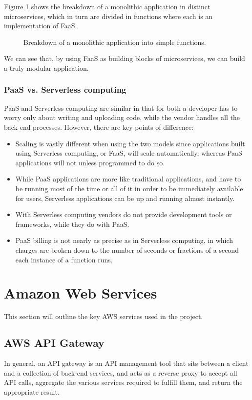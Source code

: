 Figure \ref{fig:monolithic_breakdown} shows the breakdown of a monolithic application in distinct microservices, which in turn are divided in functions where each is an implementation of FaaS. 
\begin{figure}[!htb]
    \centering
    
    \caption{Breakdown of a monolithic application into simple functions. \cite{faas}}
    \label{fig:monolithic_breakdown}
\end{figure}

We can see that, by using FaaS as building blocks of microservices, we can build a truly modular application.

\subsubsection{PaaS vs. Serverless computing}

PaaS and Serverless computing are similar in that for both a developer has to worry only about writing and uploading code, while the vendor handles all the back-end processes. However, there are key points of difference:
\begin{itemize}
    \item Scaling is vastly different when using the two models since applications built using Serverless computing, or FaaS, will scale automatically, whereas PaaS applications will not unless programmed to do so. 
    \item While PaaS applications are more like traditional applications, and have to be running most of the time or all of it in order to be immediately available for users, Serverless applications can be up and running almost instantly.
    \item With Serverless computing vendors do not provide development tools or frameworks, while they do with PaaS.
    \item PaaS billing is not nearly as precise as in Serverless computing, in which charges are broken down to the number of seconds or fractions of a second each instance of a function runs.
\end{itemize}


\section{Amazon Web Services}
This section will outline the key AWS services used in the project.

\subsection*{AWS API Gateway}
In general, an API gateway is an API management tool that sits between a client and a collection of back-end services, and acts as a reverse proxy to accept all API calls, aggregate the various services required to fulfill them, and return the appropriate result.


